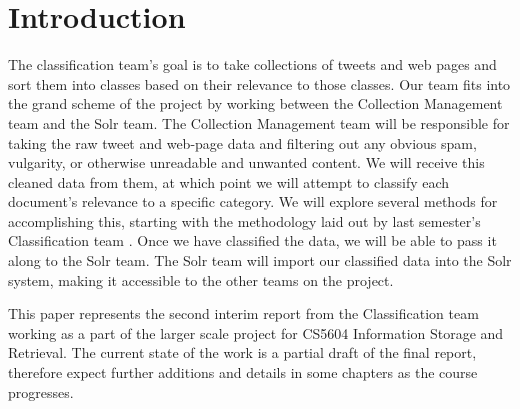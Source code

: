 \chapter{Introduction}\label{ch:introduction}

The classification team’s goal is to take collections of tweets and web pages and sort them into classes based on their relevance to those classes. Our team fits into the grand scheme of the project by working between the Collection Management team and the Solr team. The Collection Management team will be responsible for taking the raw tweet and web-page data and filtering out any obvious spam, vulgarity, or otherwise unreadable and unwanted content. We will receive this cleaned data from them, at which point we will attempt to classify each document's relevance to a specific category. We will explore several methods for accomplishing this, starting with the methodology laid out by last semester’s Classification team \cite{cui2015classification}. Once we have classified the data, we will be able to pass it along to the Solr team. The Solr team will import our classified data into the Solr system, making it accessible to the other teams on the project.


This paper represents the second interim report from the Classification team working as a part of the larger scale project for CS5604 Information Storage and Retrieval. The current state of the work is a partial draft of the final report, therefore expect further additions and details in some chapters as the course progresses.

